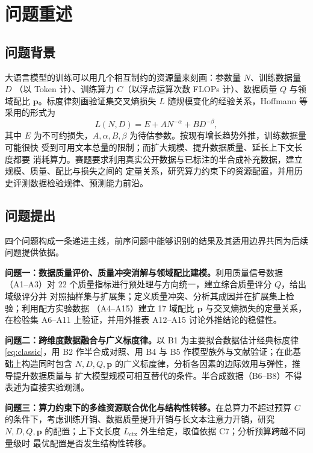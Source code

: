 \section{问题重述}

\subsection{问题背景}

大语言模型的训练可以用几个相互制约的资源量来刻画：参数量 $N$、训练数据量 $D$
（以 Token 计）、训练算力 $C$（以浮点运算次数 FLOPs 计）、数据质量 $Q$ 与领域配比
$\boldsymbol{p}$。标度律刻画验证集交叉熵损失 $L$ 随规模变化的经验关系，Hoffmann 等\cite{hoffmann2022chinchilla}
采用的形式为
\begin{equation}
  L(N,D)=E+A N^{-\alpha}+B D^{-\beta},
  \label{eq:classic}
\end{equation}
其中 $E$ 为不可约损失，$A,\alpha,B,\beta$ 为待估参数。按现有增长趋势外推，训练数据量可能很快
受到可用文本总量的限制\cite{muennighoff2023data}；而扩大规模、提升数据质量、延长上下文长度都要
消耗算力。赛题要求利用真实公开数据与已标注的半合成补充数据，建立规模、质量、配比与损失之间的
定量关系，研究算力约束下的资源配置，并用历史评测数据检验规律、预测能力前沿。

\subsection{问题提出}

四个问题构成一条递进主线，前序问题中能够识别的结果及其适用边界共同为后续问题提供依据。

\textbf{问题一：数据质量评价、质量冲突消解与领域配比建模。}利用质量信号数据
（A1--A3）对 22 个质量指标进行预处理与方向统一，建立综合质量评分 $Q$，给出域级评分并
对照抽样集与扩展集；定义质量冲突、分析其成因并在扩展集上检验；利用配方实验数据
（A4--A15）建立 17 域配比 $\boldsymbol{p}$ 与交叉熵损失的定量关系，在检验集 A6--A11
上验证，并用外推表 A12--A15 讨论外推结论的稳健性。

\textbf{问题二：跨维度数据融合与广义标度律。}以 B1 为主要拟合数据估计经典标度律
\eqref{eq:classic}，用 B2 作半合成对照、用 B4 与 B5 作模型族外与文献验证；在此基础上构造同时包含
$N,D,Q,\boldsymbol{p}$ 的广义标度律，分析各因素的边际效用与弹性，推导提升数据质量与
扩大模型规模可相互替代的条件。半合成数据（B6--B8）不得表述为直接实验观测。

\textbf{问题三：算力约束下的多维资源联合优化与结构性转移。}在总算力不超过预算 $C$
的条件下，考虑训练开销、数据质量提升开销与长文本注意力开销，研究 $N,D,Q,\boldsymbol{p}$
的配置；上下文长度 $L_{\mathrm{ctx}}$ 外生给定，取值依据 C7；分析预算跨越不同量级时
最优配置是否发生结构性转移。

